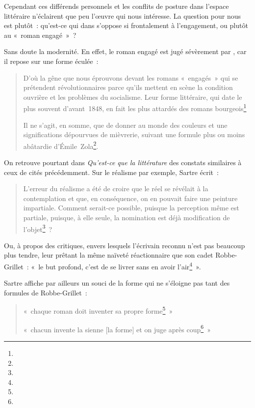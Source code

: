 \documentclass[12pt, a4paper]{article}
\begin{document}
Cependant ces différends personnels et les conflits de posture dans l'espace littéraire n'éclairent que peu l'œuvre qui nous intéresse. La question pour nous est plutôt~: qu'est-ce qui dans \punr{} s'oppose si frontalement à l'engagement, ou plutôt au «~roman engagé~»~?

Sans doute la modernité. En effet, le roman engagé est jugé sévèrement par \robbe, car il repose sur une forme éculée~: 
\begin{quote}
    D'où la gêne que nous éprouvons devant les romans «~engagés~» qui se prétendent révolutionnaires parce qu'ils mettent en scène la condition ouvrière et les problèmes du socialisme. Leur forme littéraire, qui date le plus souvent d'avant~1848, en fait les plus attardés des romans bourgeois\footnote{}

    Il ne s'agit, en somme, que de donner au monde des couleurs et une significations dépourvues de mièvrerie, suivant une formule plus ou moins abâtardie d'Émile~Zola\footnote{}.
\end{quote}


On retrouve pourtant dans \textit{Qu'est-ce que la littérature} des constats similaires à ceux de \punr{}  cités précédemment. Sur le réalisme par exemple, Sartre écrit~:
    \begin{quote}
        L'erreur du réalisme a été de croire que le réel se révélait à la contemplation et que, en conséquence, on en pouvait faire une peinture impartiale. Comment serait-ce possible, puisque la perception même est partiale, puisque, à elle seule, la nomination est déjà modification de l'objet\footnote{}~?
    \end{quote}
 Ou, à propos des critiques, envers lesquels l'écrivain reconnu n'est pas beaucoup plus tendre, leur prêtant la même naïveté réactionnaire que son cadet Robbe-Grillet~: «~le but profond, c'est de se livrer sans en avoir l'air\footnote{}~».

Sartre affiche par ailleurs un souci de la forme qui ne s'éloigne pas tant des formules de Robbe-Grillet~: 
\begin{quote}
    «~chaque roman doit inventer sa propre forme\footnote{}~» 

    «~chacun invente la sienne [la forme] et on juge après coup\footnote{}~»
\end{quote}
\end{document}
